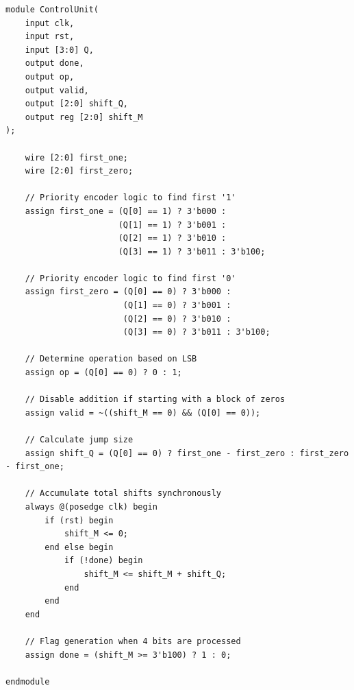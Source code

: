 \documentclass[11pt,a4paper]{article}
\begin{document}
\begin{LTR}
\begin{lstlisting}[title={\rl{کد پیمانه واحد کنترل}}]
module ControlUnit(
    input clk,
    input rst,
    input [3:0] Q,
    output done,
    output op,
    output valid,
    output [2:0] shift_Q,
    output reg [2:0] shift_M
);

    wire [2:0] first_one;
    wire [2:0] first_zero;

    // Priority encoder logic to find first '1'
    assign first_one = (Q[0] == 1) ? 3'b000 :
                       (Q[1] == 1) ? 3'b001 :
                       (Q[2] == 1) ? 3'b010 :
                       (Q[3] == 1) ? 3'b011 : 3'b100;

    // Priority encoder logic to find first '0'
    assign first_zero = (Q[0] == 0) ? 3'b000 :
                        (Q[1] == 0) ? 3'b001 :
                        (Q[2] == 0) ? 3'b010 :
                        (Q[3] == 0) ? 3'b011 : 3'b100;

    // Determine operation based on LSB
    assign op = (Q[0] == 0) ? 0 : 1; 
    
    // Disable addition if starting with a block of zeros
    assign valid = ~((shift_M == 0) && (Q[0] == 0));

    // Calculate jump size
    assign shift_Q = (Q[0] == 0) ? first_one - first_zero : first_zero - first_one;

    // Accumulate total shifts synchronously
    always @(posedge clk) begin
        if (rst) begin
            shift_M <= 0;
        end else begin
            if (!done) begin
                shift_M <= shift_M + shift_Q;
            end
        end
    end

    // Flag generation when 4 bits are processed
    assign done = (shift_M >= 3'b100) ? 1 : 0;

endmodule
\end{lstlisting}
\end{LTR}
\end{document}
